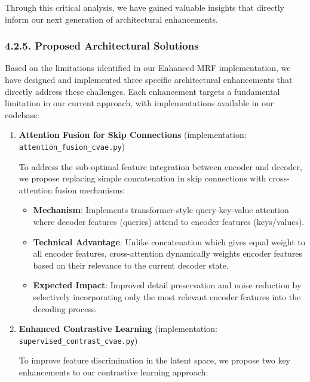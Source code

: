 \documentclass[conference]{IEEEtran}
\begin{document}
Through this critical analysis, we have gained valuable insights that directly inform our next generation of architectural enhancements.

\subsubsection*{4.2.5. Proposed Architectural Solutions}

Based on the limitations identified in our Enhanced MRF implementation, we have designed and implemented three specific architectural enhancements that directly address these challenges. Each enhancement targets a fundamental limitation in our current approach, with implementations available in our codebase:

\begin{enumerate}
    \item \textbf{Attention Fusion for Skip Connections} (implementation: \texttt{attention\_fusion\_cvae.py})
    
    To address the sub-optimal feature integration between encoder and decoder, we propose replacing simple concatenation in skip connections with cross-attention fusion mechanisms:
    
    \begin{itemize}
        \item \textbf{Mechanism}: Implements transformer-style query-key-value attention where decoder features (queries) attend to encoder features (keys/values).
        \item \textbf{Technical Advantage}: Unlike concatenation which gives equal weight to all encoder features, cross-attention dynamically weights encoder features based on their relevance to the current decoder state.
        \item \textbf{Expected Impact}: Improved detail preservation and noise reduction by selectively incorporating only the most relevant encoder features into the decoding process.
    \end{itemize}
    
    \item \textbf{Enhanced Contrastive Learning} (implementation: \texttt{supervised\_contrast\_cvae.py})
    
    To improve feature discrimination in the latent space, we propose two key enhancements to our contrastive learning approach:
    

\end{enumerate}
\end{document}
